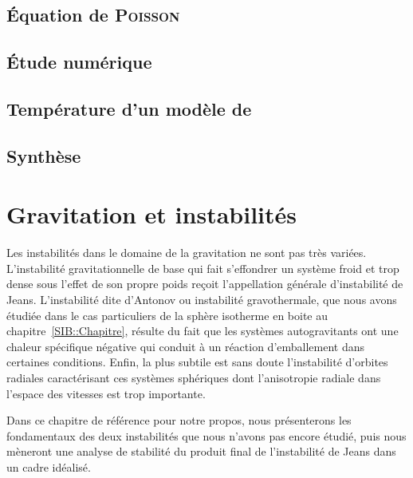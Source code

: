 	\section{Équation de \textsc{Poisson}}
		

	\section{Étude numérique}
		


	\section{Température d'un modèle de \King \label{sec::temp}}
		

	\section{Synthèse}
		


\chapter{Gravitation et instabilités}\label{Chap::Instabilite}
	\minitoc

	Les instabilités dans le domaine de la gravitation ne sont pas très variées. L'instabilité gravitationnelle de base qui fait s'effondrer un
	système froid et trop dense sous l'effet de son propre poids reçoit l'appellation générale d'instabilité de Jeans. L'instabilité dite
	d'Antonov ou instabilité gravothermale, que nous avons étudiée dans le cas particuliers de la sphère isotherme en boite au
	chapitre~\ref{SIB::Chapitre}, résulte du fait que les systèmes autogravitants ont une chaleur spécifique négative qui conduit à un réaction
	d'emballement dans certaines conditions. Enfin, la plus subtile est sans doute l'instabilité d'orbites radiales caractérisant ces systèmes
	sphériques dont l'anisotropie radiale dans l'espace des vitesses est trop importante.

	Dans ce chapitre de référence pour notre propos, nous présenterons les fondamentaux des deux instabilités que nous n'avons pas encore étudié,
	puis nous mèneront une analyse de stabilité du produit final de l'instabilité de Jeans dans un cadre idéalisé.

